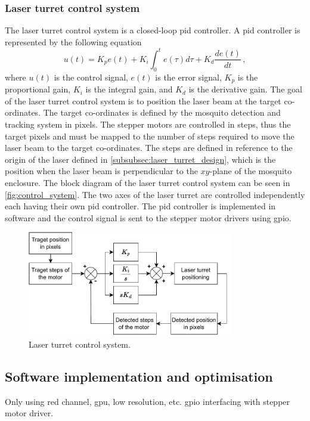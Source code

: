 \subsubsection{Laser turret control system}
The laser turret control system is a closed-loop \gls{pid} controller. A \gls{pid} controller is represented by the following equation
\begin{equation}
    \label{eq:pid_controller}
    u(t) = K_p e(t) + K_i \int_{0}^{t} e(\tau) d\tau + K_d \frac{de(t)}{dt}\,,
\end{equation}
where $u(t)$ is the control signal, $e(t)$ is the error signal, $K_p$ is the proportional gain, $K_i$ is the integral gain, and $K_d$ is the derivative gain. The goal of the laser turret control system is to position the laser beam at the target co-ordinates. The target co-ordinates is defined by the mosquito detection and tracking system in pixels. The stepper motors are controlled in steps, thus the target pixels and must be mapped to the number of steps required to move the laser beam to the target co-ordinates. The steps are defined in reference to the origin of the laser defined in \autoref{subsubsec:laser_turret_design}, which is the position when the laser beam is perpendicular to the $xy$-plane of the mosquito enclosure. The block diagram of the laser turret control system can be seen in \autoref{fig:control_system}. The two axes of the laser turret are controlled independently each having their own \gls{pid} controller. The \gls{pid} controller is implemented in software and the control signal is sent to the stepper motor drivers using \gls{gpio}.
\begin{figure}[h]
    \centering
    \includegraphics[width=0.8\textwidth]{figures/control_system.pdf}
    \caption{Laser turret control system.}
    \label{fig:control_system}
\end{figure}



\subsection{Software implementation and optimisation}
Only using red channel, \gls{gpu}, low resolution, etc.
\gls{gpio} interfacing with stepper motor driver.

